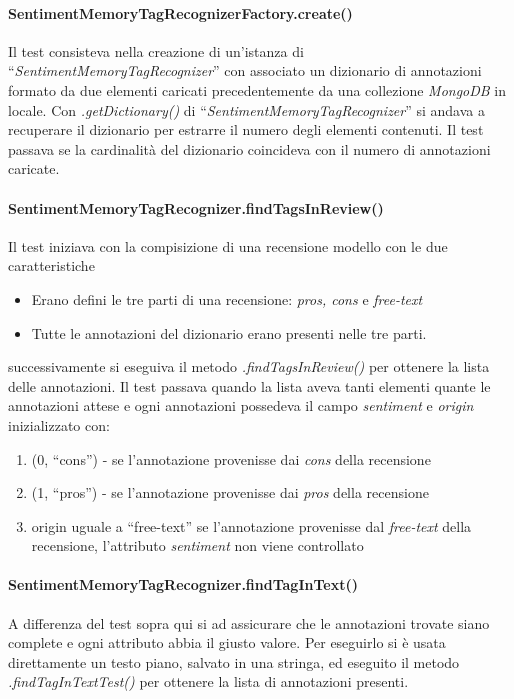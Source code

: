 \paragraph{SentimentMemoryTagRecognizerFactory.create()}
Il test consisteva nella creazione di un'istanza di
``\textit{SentimentMemoryTagRecognizer}'' con associato un dizionario di
annotazioni formato da due elementi caricati precedentemente da una collezione
\textit{MongoDB} in locale. Con \textit{.getDictionary()} di
``\textit{SentimentMemoryTagRecognizer}'' si andava a recuperare il dizionario
per estrarre il numero degli elementi contenuti. Il test passava se la
cardinalità del dizionario coincideva con il numero di annotazioni caricate.

\paragraph{SentimentMemoryTagRecognizer.findTagsInReview()}
Il test iniziava con la compisizione di una recensione modello con le due
caratteristiche
\begin{itemize}
\item Erano defini le tre parti di una recensione: \textit{pros, cons} e
\textit{free-text}
\item Tutte le annotazioni del dizionario erano presenti nelle tre parti.
\end{itemize}
successivamente si eseguiva il metodo \textit{.findTagsInReview()} per ottenere
la lista delle annotazioni. Il test passava quando la lista aveva tanti elementi
quante le annotazioni attese e ogni annotazioni possedeva il campo
\textit{sentiment} e \textit{origin} inizializzato con:
\begin{enumerate}
\item (0, ``cons'') - se l'annotazione provenisse dai \textit{cons} della
recensione
\item (1, ``pros'') - se l'annotazione provenisse dai \textit{pros} della
recensione
\item origin uguale a ``free-text'' se l'annotazione provenisse dal
\textit{free-text} della recensione, l'attributo \textit{sentiment} non viene
controllato
\end{enumerate}

\paragraph{SentimentMemoryTagRecognizer.findTagInText()}
A differenza del test sopra qui si ad assicurare che le annotazioni trovate
siano complete e ogni attributo abbia il giusto valore. Per eseguirlo si è
usata direttamente un testo piano, salvato in una stringa, ed eseguito il metodo
\textit{.findTagInTextTest()} per ottenere la lista di annotazioni presenti.

